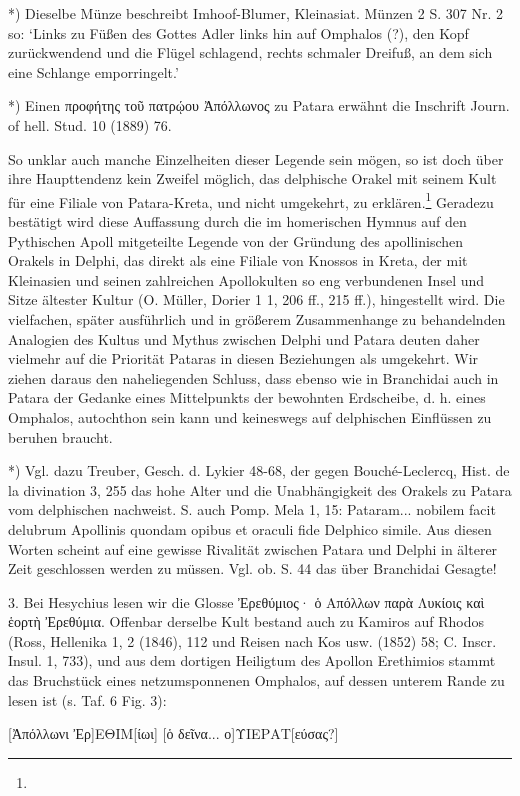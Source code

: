 \documentclass[a4paper, 11pt, oneside]{article}
\begin{document}
*) Dieselbe Münze beschreibt Imhoof-Blumer, Kleinasiat. Münzen 2 S. 307 Nr. 2 so: `Links zu Füßen des Gottes Adler links hin auf Omphalos (?), den Kopf zurückwendend und die Flügel schlagend, rechts schmaler Dreifuß, an dem sich eine Schlange emporringelt.'

*) Einen προφήτης τοῦ πατρῴου Ἀπόλλωνος zu Patara erwähnt die Inschrift Journ. of hell. Stud. 10 (1889) 76.

So unklar auch manche Einzelheiten dieser Legende sein mögen, so ist doch über ihre Haupttendenz kein Zweifel möglich, das delphische Orakel mit seinem Kult für eine Filiale von Patara-Kreta, und nicht umgekehrt, zu erklären.\footnote{} Geradezu bestätigt wird diese Auffassung durch die im homerischen Hymnus auf den Pythischen Apoll mitgeteilte Legende von der Gründung des apollinischen Orakels in Delphi, das direkt als eine Filiale von Knossos in Kreta, der mit Kleinasien und seinen zahlreichen Apollokulten so eng verbundenen Insel und Sitze ältester Kultur (O. Müller, Dorier 1 1, 206 ff., 215 ff.), hingestellt wird. Die vielfachen, später ausführlich und in größerem Zusammenhange zu behandelnden Analogien des Kultus und Mythus zwischen Delphi und Patara deuten daher vielmehr auf die Priorität Pataras in diesen Beziehungen als umgekehrt. Wir ziehen daraus den naheliegenden Schluss, dass ebenso wie in Branchidai auch in Patara der Gedanke eines Mittelpunkts der bewohnten Erdscheibe, d. h. eines Omphalos, autochthon sein kann und keineswegs auf delphischen Einflüssen zu beruhen braucht.

*) Vgl. dazu Treuber, Gesch. d. Lykier 48-68, der gegen Bouché-Leclercq, Hist. de la divination 3, 255 das hohe Alter und die Unabhängigkeit des Orakels zu Patara vom delphischen nachweist. S. auch Pomp. Mela 1, 15: Pataram... nobilem facit delubrum Apollinis quondam opibus et oraculi fide Delphico simile. Aus diesen Worten scheint auf eine gewisse Rivalität zwischen Patara und Delphi in älterer Zeit geschlossen werden zu müssen. Vgl. ob. S. 44 das über Branchidai Gesagte!

3. Bei Hesychius lesen wir die Glosse Ἐρεθύμιος· ὁ Απόλλων παρὰ Λυκίοις καὶ ἑορτὴ Ἐρεθύμια. Offenbar derselbe Kult bestand auch zu Kamiros auf Rhodos (Ross, Hellenika 1, 2 (1846), 112 und Reisen nach Kos usw. (1852) 58; C. Inscr. Insul. 1, 733), und aus dem dortigen Heiligtum des Apollon Erethimios stammt das Bruchstück eines netzumsponnenen Omphalos, auf dessen unterem Rande zu lesen ist (s. Taf. 6 Fig. 3):

[Ἀπόλλωνι Ἐρ]ΕΘΙΜ[ίωι]  
[ὁ δεῖνα... ο]ΥΙΕΡΑΤ[εύσας?]
\end{document}
